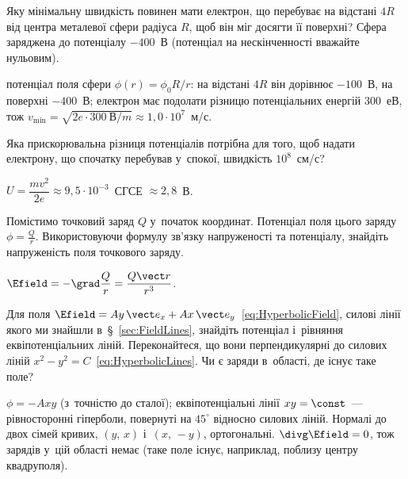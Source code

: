 \begin{problem}%
	Яку мінімальну швидкість повинен мати електрон, що перебуває на відстані $4R$ від
	центра металевої сфери радіуса $R$, щоб він міг досягти її поверхні? Сфера заряджена до
	потенціалу $-400$~В (потенціал на нескінченності вважайте нульовим).
	\begin{solution}
		потенціал поля сфери $\phi(r)=\phi_0R/r$: на відстані $4R$ він дорівнює $-100$~В, на поверхні $-400$~В; електрон має подолати різницю потенціальних енергій $300$~еВ, тож $v_{\min}=\sqrt{2e\cdot300~\text{В}/m}\approx1{,}0\cdot10^{7}$~м/с.
	\end{solution}
\end{problem}

\begin{problem}%
	Яка прискорювальна різниця потенціалів потрібна для того, щоб надати електрону, що
	спочатку перебував у~спокої, швидкість $10^8$~см/с?
	\begin{solution}
		$U=\dfrac{mv^2}{2e}\approx9{,}5\cdot10^{-3}$~СГСЕ $\approx2{,}8$~В.
	\end{solution}
\end{problem}

\begin{problem}%
	Помістимо точковий заряд $Q$ у~початок координат. Потенціал поля цього заряду $\phi =
		\frac{Q}{r}$. Використовуючи формулу зв'язку напруженості та потенціалу, знайдіть
	напруженість поля точкового заряду.
	\begin{solution}
		$\Efield=-\grad\dfrac{Q}{r}=\dfrac{Q\vect r}{r^3}$.
	\end{solution}
\end{problem}

\begin{problem}%
	Для поля $\Efield = Ay\,\vect e_x + Ax\,\vect e_y$~\eqref{eq:HyperbolicField}, силові лінії
	якого ми знайшли в~\S~\ref{sec:FieldLines}, знайдіть потенціал і~рівняння
	еквіпотенціальних ліній. Переконайтеся, що вони перпендикулярні до силових ліній
	$x^2-y^2=C$~\eqref{eq:HyperbolicLines}. Чи є заряди в~області, де існує таке поле?
	\begin{solution}
		$\phi=-Axy$ (з~точністю до сталої); еквіпотенціальні лінії $xy=\const$~--- рівносторонні гіперболи, повернуті на $45^\circ$ відносно силових ліній. Нормалі до двох сімей кривих, $(y,\,x)$ і~$(x,\,-y)$, ортогональні. $\divg\Efield=0$, тож зарядів у~цій області немає (таке поле існує, наприклад, поблизу центру квадруполя).
	\end{solution}
\end{problem}


